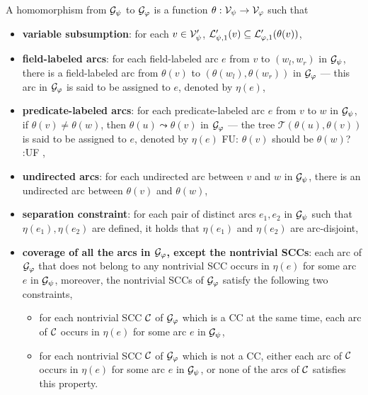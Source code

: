 \documentclass{llncs}
\newcommand{\fu}[1]{\color{purple} {FU: #1 :UF} \color{black}}
\begin{document}
\begin{definition}\label{def-hom}
A homomorphism from $\mathcal{G}_\psi$  to $\mathcal{G}_\varphi$ is a function $\theta: \mathcal{V}_\psi \rightarrow \mathcal{V}_{\varphi}$ such that
\begin{itemize}
\item{\bf variable subsumption}: for each $v \in \mathcal{V}'_{\psi}$, $\mathcal{L}'_{\psi,1}(v) \subseteq \mathcal{L}'_{\varphi,1}(\theta(v))$,
%
%
\item{\bf field-labeled arcs}: for each field-labeled arc $e$ from $v$ to $(w_l, w_r)$ in $\mathcal{G}_{\psi}$, there is a  field-labeled arc from $\theta(v)$ to $(\theta(w_l), \theta(w_r))$ in $\mathcal{G}_{\varphi}$ --- this arc in $\mathcal{G}_{\varphi}$ is said to be assigned to $e$, denoted by $\eta(e)$,
%
\item{\bf predicate-labeled arcs}: for each predicate-labeled arc $e$ from $v$ to $w$ in $\mathcal{G}_{\psi}$, if $\theta(v) \neq \theta(w)$, then $\theta(u)\leadsto \theta(v)$ %
in $\mathcal{G}_{\varphi}$ --- the tree $\mathcal{T}(\theta(u), \theta(v))$ is said to be assigned to $e$, denoted by $\eta(e)$ \fu{$\theta(v)$ should be $\theta(w)$?},
%
\item {\bf undirected arcs}: for each undirected arc between $v$ and $w$ in $\mathcal{G}_\psi$, there is an undirected arc between $\theta(v)$ and $\theta(w)$,

\item {\bf separation constraint}: for each pair of distinct arcs $e_1,e_2$ in $\mathcal{G}_\psi$ such that $\eta(e_1),\eta(e_2)$ are defined, it holds that $\eta(e_1)$ and $\eta(e_2)$ are arc-disjoint,
%
%
\item {\bf coverage of all the arcs in $\mathcal{G}_{\varphi}$, except the nontrivial SCCs}: each arc of $\mathcal{G}_{\varphi}$ that does not belong to any nontrivial SCC occurs in $\eta(e)$ for some arc $e$ in $\mathcal{G}_{\psi}$, moreover, the nontrivial SCCs of $\mathcal{G}_\varphi$ satisfy the following two constraints,
\begin{itemize}
\item for each nontrivial SCC $\mathcal{C}$ of $\mathcal{G}_\varphi$ which is a CC at the same time, each arc of $\mathcal{C}$ occurs in $\eta(e)$ for some arc $e$ in $\mathcal{G}_\psi$,
%
\item for each nontrivial SCC $\mathcal{C}$ of $\mathcal{G}_\varphi$ which is not a CC, either each arc of $\mathcal{C}$ occurs in $\eta(e)$ for some arc $e$ in $\mathcal{G}_{\psi}$, or none of the arcs of $\mathcal{C}$ satisfies this property.
\end{itemize}

\end{itemize}
\end{definition}
\end{document}
